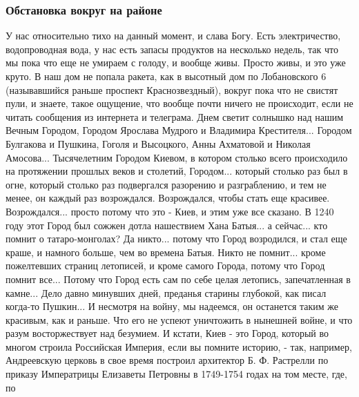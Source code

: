  
 
 
 
 

\subsubsection{Обстановка вокруг на районе}

У нас относительно тихо на данный момент,
и слава Богу. Есть электричество, водопроводная вода, у нас есть запасы
продуктов на несколько недель, так что мы пока что еще не умираем с голоду, и
вообще живы. Просто живы, и это уже круто.  В наш дом не попала ракета, как в
высотный дом по Лобановского 6 (называвшийся раньше проспект Краснозвездный),
вокруг пока что не свистят пули, и знаете, такое ощущение, что вообще почти
ничего не происходит, если не читать сообщения из интернета и телеграма.  Днем
светит солнышко над нашим Вечным Городом, Городом Ярослава Мудрого и Владимира
Крестителя... Городом Булгакова и Пушкина, Гоголя и Высоцкого, Анны Ахматовой и
Николая Амосова... Тысячелетним Городом Киевом, в котором столько всего
происходило на протяжении прошлых веков и столетий, Городом... который столько раз был в
огне, который столько раз подвергался разорению и разграблению, и тем не менее,
он каждый раз возрождался. Возрождался, чтобы стать еще красивее.
Возрождался...  просто потому что это - Киев, и этим уже все сказано. В 1240
году этот Город был сожжен дотла нашествием Хана Батыя... а сейчас... кто
помнит о татаро-монголах?  Да никто...  потому что Город возродился, и стал еще
краше, и намного больше, чем во времена Батыя.  Никто не помнит... кроме
пожелтевших страниц летописей, и кроме самого Города, потому что Город помнит
все... Потому что Город есть сам по себе целая летопись, запечатленная в
камне... Дело давно минувших дней, преданья старины глубокой, как писал
когда-то Пушкин... И несмотря на войну, мы надеемся, он останется таким же
красивым, как и раньше.  Что его не успеют уничтожить в нынешней войне, и что
разум восторжествует над безумием.  И кстати, Киев - это Город, который во
многом строила Российская Империя, если вы помните историю, - так, например,
Андреевскую церковь в свое время построил архитектор Б. Ф. Растрелли по приказу
Императрицы Елизаветы Петровны в 1749-1754 годах на том месте, где, по
